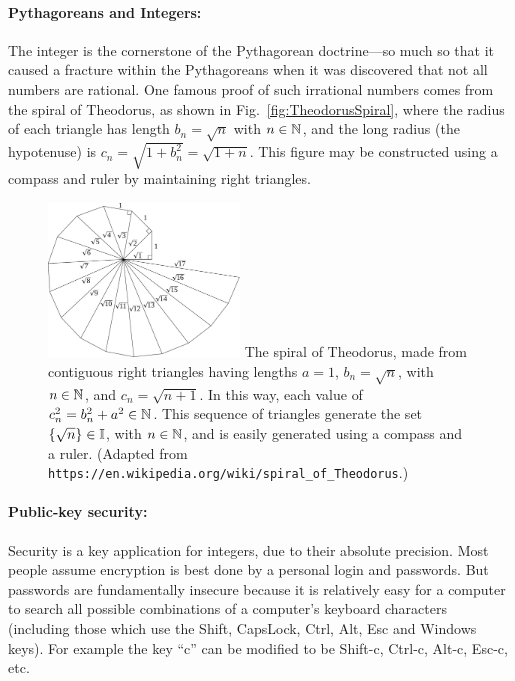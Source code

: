 \documentclass{ximera}
\begin{document}
\paragraph{Pythagoreans and Integers:}
 
The integer is the cornerstone of the Pythagorean doctrine---so much so that it caused a fracture within
the Pythagoreans when it was discovered that not all numbers are rational. One famous proof of such
irrational numbers comes from the spiral of Theodorus, as shown in Fig.~\ref{fig:TheodorusSpiral},
where the radius of each triangle has length $b_n=\sqrt{n}$ with $n\in\mathbb{N}$, and the long radius
(the hypotenuse) is $c_n=\sqrt{1+b_n^2}=\sqrt{1+n}$. This figure may be constructed using a compass and
ruler by maintaining right triangles.  
\begin{figure}[ht]
\centering
\includegraphics[width=2in]{EPS/Spiral_of_Theodorus-v1.pdf}
The spiral of Theodorus, made from contiguous right triangles having
lengths $a=1$, $b_n=\sqrt{n}$, with $n\in\mathbb{N}$, and $c_n=\sqrt{n+1}$. 
In this way, each value of $c^2_n=b^2_n+a^2\in\mathbb{N}$.
This sequence of triangles generate the set $\{\sqrt{n}\}\in\mathbb{I}$, with $n \in\mathbb{N}$, and is easily generated using a compass and a ruler.
(Adapted from
\texttt{\scriptsize https://en.wikipedia.org/wiki/spiral\_of\_Theodorus}.)  %
\end{figure}

\paragraph{Public-key security:}
    
Security is a key application for integers, due to their absolute precision.
Most people assume encryption is best done by a personal login and passwords.
But passwords are fundamentally insecure because it is relatively easy for a computer to search all possible combinations of a computer's keyboard characters
 (including those which use the Shift, CapsLock, Ctrl, Alt, Esc and Windows keys).
 For example the key ``c'' can be modified to be Shift-c, Ctrl-c, Alt-c, Esc-c, etc.
\end{document}
